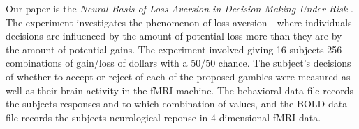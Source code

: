 \par Our paper is the \textit{Neural Basis of Loss Aversion in Decision-Making Under Risk} \cite{Tom2007LossAversion}. The experiment investigates the phenomenon of loss aversion - where individuals decisions are influenced by the amount of potential loss more than they are by the amount of potential gains. The experiment involved giving 16 subjects 256 combinations of gain/loss of dollars with a 50/50 chance. The subject's decisions of whether to accept or reject of each of the proposed gambles were measured as well as their brain activity in the fMRI machine. The behavioral data file records the subjects responses and to which combination of values, and the BOLD data file records the subjects neurological reponse in 4-dimensional fMRI data. 


